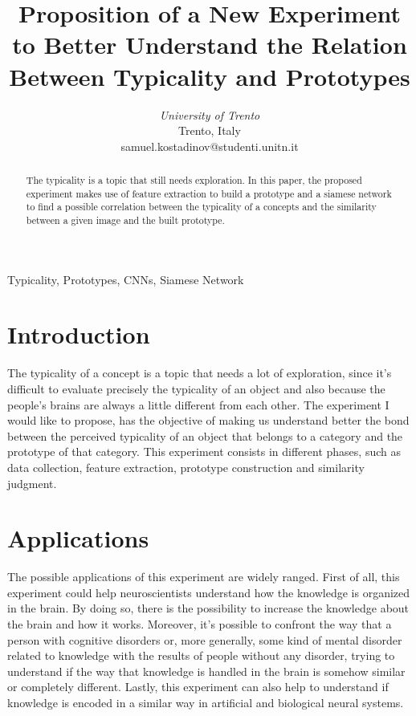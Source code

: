 \documentclass[conference]{IEEEtran}
\begin{document}
	\title{Proposition of a New Experiment to Better Understand the Relation Between Typicality and Prototypes}


	\author{
	\textit{University of Trento}\\
	Trento, Italy \\
	samuel.kostadinov@studenti.unitn.it}


	\maketitle


	\begin{abstract}
		
		The typicality is a topic that still needs exploration. In this paper, the proposed experiment makes use of feature extraction to build a prototype and a siamese network to find a possible correlation 
		between the typicality of a concepts and the similarity between a given image and the built prototype. 
		
	\end{abstract}

	\begin{IEEEkeywords}
		Typicality, Prototypes, CNNs, Siamese Network
	\end{IEEEkeywords}


	\section{Introduction}
		
		\noindent The typicality of a concept is a topic that needs a lot of exploration, since it's difficult to evaluate precisely the typicality of an object 
		and also because the people's brains are always a little different from each other. The experiment I would like to propose, has the objective of 
		making us understand better the bond between the perceived typicality of an object that belongs to a category and the prototype of that category.
		This experiment consists in different phases, such as data collection, feature extraction, prototype construction and similarity judgment.
		
	\section{Applications}
	
		\noindent The possible applications of this experiment are widely ranged. First of all, this experiment could help neuroscientists understand how the knowledge is 
		organized in the brain. By doing so, there is the possibility to increase the knowledge about the brain and how it works. Moreover, it's possible to confront 
		the way that a person with cognitive disorders or, more generally, some kind of mental disorder related to knowledge with the results of people without 
		any disorder, trying to understand if the way that knowledge is handled in the brain is somehow similar or completely different. Lastly, this experiment can 
		also help to understand if knowledge is encoded in a similar way in artificial and biological neural systems. 
\end{document}
